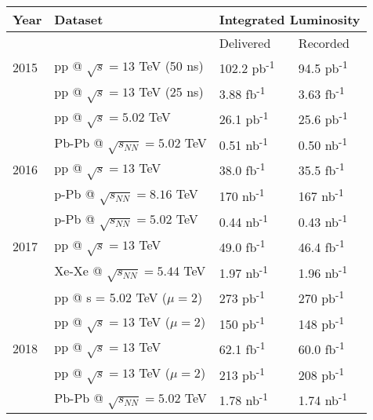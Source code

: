 \begin{table}[]
\centering
\label{tab:dataset_luminosity}
\begin{tabular}{|l|l|l|l|}
\hline
Year & Dataset                              & \multicolumn{2}{c|}{Integrated Luminosity}  \\
\hline
     &                                      & Delivered    & Recorded    \\
\hline
2015 & pp @ $\sqrt{s} = 13$ TeV (50 ns)     &  102.2  pb\textsuperscript{-1}   & 94.5  pb\textsuperscript{-1}  \\
     & pp @ $\sqrt{s} = 13$ TeV (25 ns)     &  3.88   fb\textsuperscript{-1}   & 3.63  fb\textsuperscript{-1}  \\
     & pp @ $\sqrt{s} = 5.02$ TeV           &  26.1   pb\textsuperscript{-1}   & 25.6  pb\textsuperscript{-1}  \\
     & Pb-Pb @ $\sqrt{s_{NN}} = 5.02$ TeV   &  0.51   nb\textsuperscript{-1}   &  0.50 nb\textsuperscript{-1}  \\
\hline
2016 & pp @ $\sqrt{s} = 13$ TeV             &  38.0   fb\textsuperscript{-1}   & 35.5  fb\textsuperscript{-1}  \\
     & p-Pb @ $\sqrt{s_{NN}} = 8.16$ TeV    &  170    nb\textsuperscript{-1}   & 167   nb\textsuperscript{-1}  \\
     & p-Pb @ $\sqrt{s_{NN}} = 5.02$ TeV    &  0.44   nb\textsuperscript{-1}   &  0.43 nb\textsuperscript{-1}  \\
\hline
2017 & pp @ $\sqrt{s} = 13$ TeV             &  49.0   fb\textsuperscript{-1}   & 46.4  fb\textsuperscript{-1}  \\
     & Xe-Xe @ $\sqrt{s_{NN}} = 5.44$ TeV   &  1.97   nb\textsuperscript{-1}   &  1.96 nb\textsuperscript{-1}  \\
     & pp @ s = 5.02 TeV ($\mu=2$)          &  273    pb\textsuperscript{-1}   & 270   pb\textsuperscript{-1}  \\
     & pp @ $\sqrt{s} = 13$ TeV ($\mu=2$)   &  150    pb\textsuperscript{-1}   & 148   pb\textsuperscript{-1}  \\
\hline
2018 & pp @ $\sqrt{s} = 13$ TeV             &  62.1   fb\textsuperscript{-1}   & 60.0  fb\textsuperscript{-1}  \\
     & pp @ $\sqrt{s} = 13$ TeV ($\mu=2$)   &  213    pb\textsuperscript{-1}   & 208   pb\textsuperscript{-1}  \\
     & Pb-Pb @ $\sqrt{s_{NN}} = 5.02$ TeV   &  1.78   nb\textsuperscript{-1}   &  1.74 nb\textsuperscript{-1}  \\ 
\hline
\end{tabular}
\caption{\cite{data_quality}}
\end{table}
